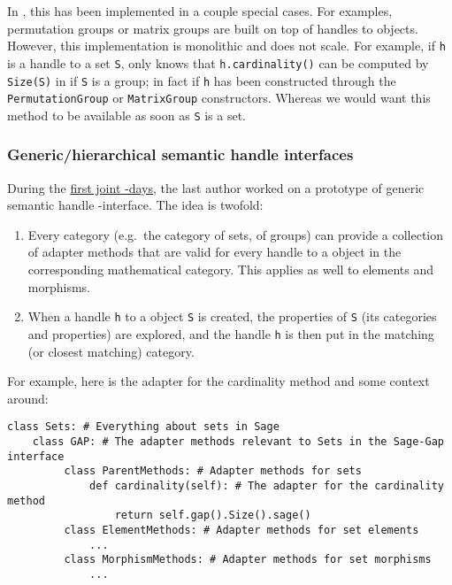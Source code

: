 In \Sage, this has been implemented in a couple special cases. For
examples, \Sage permutation groups or matrix groups are built on top
of handles to \GAP objects. However, this implementation is monolithic
and does not scale. For example, if \texttt{h} is a handle to a set
\texttt{S}, \Sage only knows that \texttt{h.cardinality()} can be
computed by \texttt{Size(S)} in \GAP if \texttt{S} is a group; in fact
if \texttt{h} has been constructed through the
\texttt{PermutationGroup} or \texttt{MatrixGroup}
constructors. Whereas we would want this method to be available as
soon as \texttt{S} is a set.

\subsubsection{Generic/hierarchical semantic handle interfaces}\label{generichierarchical-semantic-handle-interfaces}

During the \href{http://gapdays.de/gap-sage-days2016/}{first joint
  \GAP-\Sage days}, the last author worked on a prototype of generic
semantic handle \Sage-\GAP interface. The idea is twofold:

\begin{enumerate}
\def\labelenumi{\arabic{enumi}.}
\item Every \Sage category (e.g.~the category of sets, of groups) can
  provide a collection of adapter methods that are valid for every
  handle to a \GAP object in the corresponding mathematical category.
  This applies as well to elements and morphisms.
\item When a handle \texttt{h} to a \GAP object \texttt{S} is created,
  the properties of \texttt{S} (its \GAP categories and properties)
  are explored, and the handle \texttt{h} is then put in the matching
  (or closest matching) \Sage category.
\end{enumerate}

For example, here is the adapter for the cardinality method and some
context around:
\begin{verbatim}
class Sets: # Everything about sets in Sage
    class GAP: # The adapter methods relevant to Sets in the Sage-Gap interface
         class ParentMethods: # Adapter methods for sets
             def cardinality(self): # The adapter for the cardinality method
                 return self.gap().Size().sage()
         class ElementMethods: # Adapter methods for set elements
             ...
         class MorphismMethods: # Adapter methods for set morphisms
             ...
\end{verbatim}

